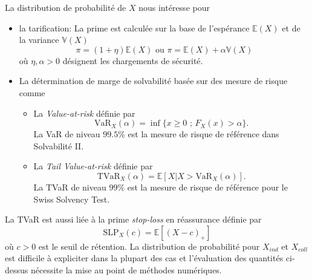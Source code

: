 \documentclass[8pt,notheorems]{beamer}
\def \E{\mathbb E}
\def \V{\mathbb V}
\theoremstyle{definition}
\theoremstyle{example}
\theoremstyle{mystyle}
\theoremstyle{plain}
\begin{document}
\begin{frame}[allowframebreaks]
La distribution de probabilité de $X$ nous intéresse pour 
\begin{itemize}
    \item la tarification: La prime est calculée sur la base de l'espérance $\E(X)$ et de la variance $\V(X)$ 
    $$
    \pi = (1+\eta)\E(X)\text{ ou }\pi = \E(X)+\alpha \V(X)
    $$
    où $\eta,\alpha>0$ désignent les chargements de sécurité. 
    \item La détermination de marge de solvabilité basée sur des mesure de risque comme
    \begin{itemize}
        \item La \textit{Value-at-risk} définie par 
        $$
        \text{VaR}_X(\alpha) = \inf\{x\geq 0\text{ ; }F_X(x)> \alpha\}.
        $$
        La VaR de niveau $99.5\%$ est la mesure de risque de référence dans Solvabilité II.
        \item La \textit{Tail Value-at-risk} définie par 
        $$
        \text{TVaR}_X(\alpha) = \mathbb{E}\left[X|X>\text{VaR}_X(\alpha)\right].
        $$
        La TVaR de niveau $99\%$ est la mesure de risque de référence pour le Swiss Solvency Test.
    \end{itemize}
\end{itemize}
La TVaR est aussi liée à la prime \textit{stop-loss} en réassurance définie par 
$$
\text{SLP}_X(c) = \E\left[(X-c)_+\right]
$$
où $c>0$ est le seuil de rétention. La distribution de probabilité pour $X_{ind}$ et $X_{coll}$ est difficile à expliciter dans la plupart des cas et l'évaluation des quantités ci-dessus nécessite la mise au point de méthodes numériques.\\


\end{frame}
\end{document}
